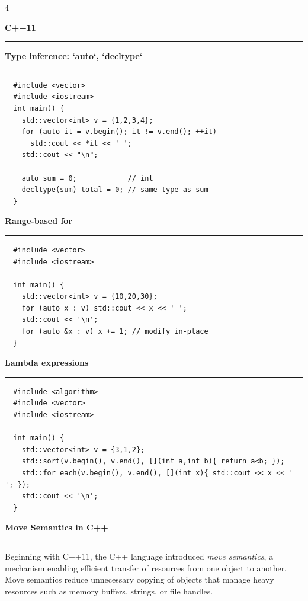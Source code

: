\documentclass[final]{beamer}
\renewcommand{\section}[1]{%
  \par\vspace{1em}%
  {\noindent\Large\bfseries #1\par}%
  \vspace{0.5em}\hrule\vspace{1em}%
}
\renewcommand{\subsection}[1]{%
  \par\vspace{1em}%
  {\noindent\large\bfseries #1\par}%
  \vspace{0.5em}\hrule\vspace{1em}%

}
\begin{document}
\begin{frame}[t,fragile]
\begin{multicols}{4}
 \section{C++11}

  \subsection{Type inference: `auto`, `decltype`}

  \begin{lstlisting}
  #include <vector>
  #include <iostream>
  int main() {
    std::vector<int> v = {1,2,3,4};
    for (auto it = v.begin(); it != v.end(); ++it)
      std::cout << *it << ' ';
    std::cout << "\n";

    auto sum = 0;            // int
    decltype(sum) total = 0; // same type as sum
  }
  \end{lstlisting}

   \subsection{Range-based for}

  \begin{lstlisting}
  #include <vector>
  #include <iostream>

  int main() {
    std::vector<int> v = {10,20,30};
    for (auto x : v) std::cout << x << ' ';
    std::cout << '\n';
    for (auto &x : v) x += 1; // modify in-place
  }
  \end{lstlisting}

  \subsection{Lambda expressions}
 
  \begin{lstlisting}
  #include <algorithm>
  #include <vector>
  #include <iostream>

  int main() {
    std::vector<int> v = {3,1,2};
    std::sort(v.begin(), v.end(), [](int a,int b){ return a<b; });
    std::for_each(v.begin(), v.end(), [](int x){ std::cout << x << ' '; });
    std::cout << '\n';
  }
  \end{lstlisting}


   \section{Move Semantics in C++}

  Beginning with C++11, the C++ language introduced \textit{move semantics}, a mechanism enabling efficient transfer of resources from one object to another. Move semantics reduce unnecessary copying of objects that manage heavy resources such as memory buffers, strings, or file handles.


\end{multicols}
\end{frame}
\end{document}
